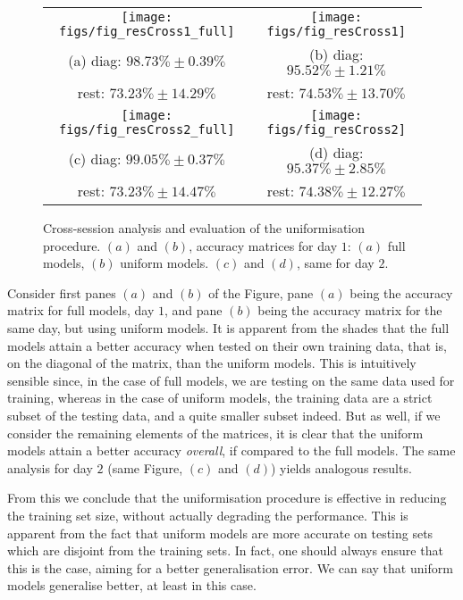 \begin{figure} \centering
  \begin{tabular}{cc}
    \texttt{[image: figs/fig\_resCross1\_full]} &
    \texttt{[image: figs/fig\_resCross1]} \\
    (a) diag: $98.73\% \pm 0.39\%$  & (b) diag: $95.52\% \pm 1.21\%$ \\
        rest: $73.23\% \pm 14.29\%$ & rest: $74.53\% \pm 13.70\%$ \\
    \texttt{[image: figs/fig\_resCross2\_full]} &
    \texttt{[image: figs/fig\_resCross2]} \\
    (c) diag: $99.05\% \pm 0.37\%$ & (d) diag: $95.37\% \pm 2.85\%$ \\
        rest: $73.23\% \pm 14.47\%$ & rest: $74.38\% \pm 12.27\%$ \\
  \end{tabular}
  \caption{Cross-session analysis and evaluation of the uniformisation
    procedure. $(a)$ and $(b)$, accuracy matrices for day $1$: $(a)$
    full models, $(b)$ uniform models. $(c)$ and $(d)$, same for day $2$.}
  \label{fig:cross_initial}
\end{figure}

Consider first panes $(a)$ and $(b)$ of the Figure, pane $(a)$
being the accuracy matrix for full models, day $1$, and pane $(b)$
being the accuracy matrix for the same day, but using uniform
models. It is apparent from the shades that the full models attain
a better accuracy when tested on their own training data, that is,
on the diagonal of the matrix, than the uniform models.  This is
intuitively sensible since, in the case of full models, we are
testing on the same data used for training, whereas in the case of
uniform models, the training data are a strict subset of the
testing data, and a quite smaller subset indeed. But as well, if
we consider the remaining elements of the matrices, it is clear
that the uniform models attain a better accuracy \emph{overall},
if compared to the full models. The same analysis for day $2$
(same Figure, $(c)$ and $(d)$) yields analogous results.

From this we conclude that the uniformisation procedure is effective
in reducing the training set size, without actually degrading the
performance. This is apparent from the fact that uniform models are
more accurate on testing sets which are disjoint from the training
sets. In fact, one should always ensure that this is the case, aiming
for a better generalisation error. We can say that uniform models
generalise better, at least in this case.

